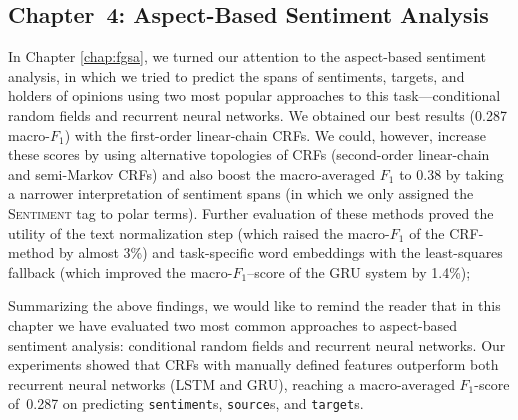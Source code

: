 \documentclass[11pt]{article}
\newcommand{\F}[0]{$F_1$}
\newcommand{\markable}[1]{\texttt{#1}}
\begin{document}
\subsection{Chapter~4: Aspect-Based Sentiment Analysis}

In Chapter \ref{chap:fgsa}, we turned our attention to the
aspect-based sentiment analysis, in which we tried to predict the
spans of sentiments, targets, and holders of opinions using two most
popular approaches to this task---conditional random fields and
recurrent neural networks.  We obtained our best results (0.287
macro-\F{}) with the first-order linear-chain CRFs.  We could,
however, increase these scores by using alternative topologies of CRFs
(second-order linear-chain and semi-Markov CRFs) and also boost the
macro-averaged \F{} to 0.38 by taking a narrower interpretation of
sentiment spans (in which we only assigned the \textsc{Sentiment} tag
to polar terms).  Further evaluation of these methods proved the
utility of the text normalization step (which raised the macro-\F{} of
the CRF-method by almost 3\%) and task-specific word embeddings with
the least-squares fallback (which improved the macro-\F{}--score of
the GRU system by 1.4\%);

Summarizing the above findings, we would like to remind the reader
that in this chapter we have evaluated two most common approaches to
aspect-based sentiment analysis: conditional random fields and
recurrent neural networks.  Our experiments showed that CRFs with
manually defined features outperform both recurrent neural networks
(LSTM and GRU), reaching a macro-averaged \F-score of~0.287 on
predicting \markable{sentiment}s, \markable{source}s, and
\markable{target}s.
\end{document}
